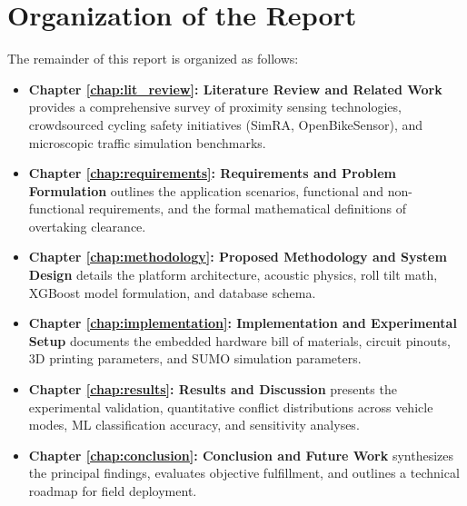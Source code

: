 \section{Organization of the Report}
The remainder of this report is organized as follows:
\begin{itemize}
    \item \textbf{Chapter \ref{chap:lit_review}: Literature Review and Related Work} provides a comprehensive survey of proximity sensing technologies, crowdsourced cycling safety initiatives (SimRA, OpenBikeSensor), and microscopic traffic simulation benchmarks.
    \item \textbf{Chapter \ref{chap:requirements}: Requirements and Problem Formulation} outlines the application scenarios, functional and non-functional requirements, and the formal mathematical definitions of overtaking clearance.
    \item \textbf{Chapter \ref{chap:methodology}: Proposed Methodology and System Design} details the platform architecture, acoustic physics, roll tilt math, XGBoost model formulation, and database schema.
    \item \textbf{Chapter \ref{chap:implementation}: Implementation and Experimental Setup} documents the embedded hardware bill of materials, circuit pinouts, 3D printing parameters, and SUMO simulation parameters.
    \item \textbf{Chapter \ref{chap:results}: Results and Discussion} presents the experimental validation, quantitative conflict distributions across vehicle modes, ML classification accuracy, and sensitivity analyses.
    \item \textbf{Chapter \ref{chap:conclusion}: Conclusion and Future Work} synthesizes the principal findings, evaluates objective fulfillment, and outlines a technical roadmap for field deployment.
\end{itemize}
